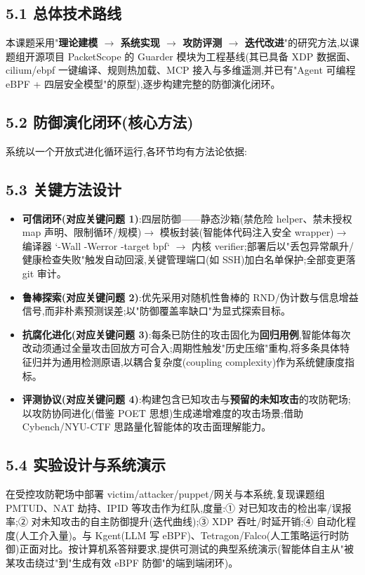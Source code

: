 \subsection*{5.1 总体技术路线}
本课题采用"\textbf{理论建模 $\to$ 系统实现 $\to$ 攻防评测 $\to$ 迭代改进}"的研究方法,以课题组开源项目 PacketScope 的 Guarder 模块为工程基线(其已具备 XDP 数据面、cilium/ebpf 一键编译、规则热加载、MCP 接入与多维遥测,并已有"Agent 可编程 eBPF + 四层安全模型"的原型),逐步构建完整的防御演化闭环。

\subsection*{5.2 防御演化闭环(核心方法)}
系统以一个开放式进化循环运行,各环节均有方法论依据:


\subsection*{5.3 关键方法设计}
\begin{itemize}[leftmargin=2em,itemsep=1pt,topsep=2pt]
  \item \textbf{可信闭环(对应关键问题 1)}:四层防御——静态沙箱(禁危险 helper、禁未授权 map 声明、限制循环/规模)$\to$ 模板封装(智能体代码注入安全 wrapper)$\to$ 编译器 `-Wall -Werror -target bpf` $\to$ 内核 verifier;部署后以"丢包异常飙升/健康检查失败"触发自动回滚,关键管理端口(如 SSH)加白名单保护;全部变更落 git 审计。
  \item \textbf{鲁棒探索(对应关键问题 2)}:优先采用对随机性鲁棒的 RND\supercite{burda2019rnd}/伪计数与信息增益信号,而非朴素预测误差;以"防御覆盖率缺口"为显式探索目标。
  \item \textbf{抗腐化进化(对应关键问题 3)}:每条已防住的攻击固化为\textbf{回归用例},智能体每次改动须通过全量攻击回放方可合入;周期性触发"历史压缩"重构,将多条具体特征归并为通用检测原语,以耦合复杂度(coupling complexity)作为系统健康度指标。
  \item \textbf{评测协议(对应关键问题 4)}:构建包含已知攻击与\textbf{预留的未知攻击}的攻防靶场;以攻防协同进化(借鉴 POET 思想)生成递增难度的攻击场景;借助 Cybench/NYU-CTF\supercite{zhang2025cybench,shao2024nyuctf} 思路量化智能体的攻击面理解能力。
\end{itemize}
\subsection*{5.4 实验设计与系统演示}
在受控攻防靶场中部署 victim/attacker/puppet/网关与本系统,复现课题组 PMTUD\supercite{feng2025pmtudisolation}、NAT 劫持\supercite{yang2024natwifi}、IPID\supercite{feng2020mixedipid} 等攻击作为红队,度量:① 对已知攻击的检出率/误报率;② 对未知攻击的自主防御提升(迭代曲线);③ XDP 吞吐/时延开销;④ 自动化程度(人工介入量)。与 Kgent\supercite{yang2024kgent}(LLM 写 eBPF)、Tetragon\supercite{tetragon2022}/Falco\supercite{falco2018}(人工策略运行时防御)正面对比。按计算机系答辩要求,提供可测试的典型系统演示(智能体自主从"被某攻击绕过"到"生成有效 eBPF 防御"的端到端闭环)。

